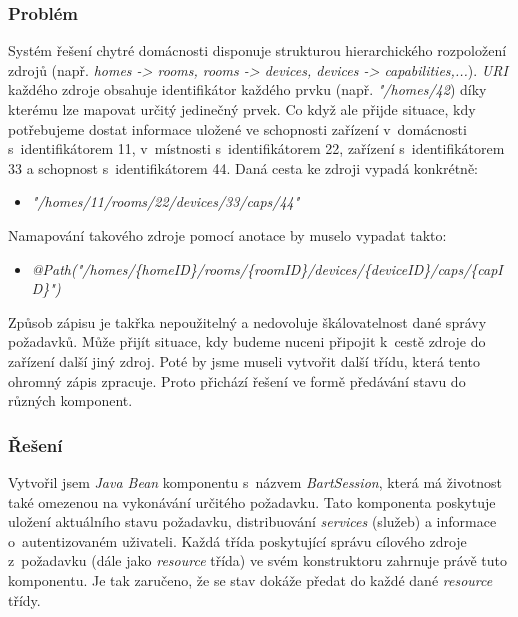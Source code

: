 \subsubsection*{Problém}
Systém řešení chytré domácnosti disponuje strukturou hierarchického rozpoložení zdrojů (např. \emph{homes -> rooms, rooms -> devices, devices -> capabilities,...}).
\emph{URI} každého zdroje obsahuje identifikátor každého prvku (např. \emph{"/homes/42}) díky kterému lze mapovat určitý jedinečný prvek.
Co když ale přijde situace, kdy potřebujeme dostat informace uložené ve schopnosti zařízení v~domácnosti s~identifikátorem 11, v~místnosti s~identifikátorem 22, zařízení s~identifikátorem 33 a schopnost s~identifikátorem 44.
\newline
Daná cesta ke zdroji vypadá konkrétně:
\begin{itemize}
  \item \emph{"/homes/11/rooms/22/devices/33/caps/44"}
\end{itemize}

Namapování takového zdroje pomocí anotace  by muselo vypadat takto:
\begin{itemize}
  \item \emph{@Path("/homes/\{homeID\}/rooms/\{roomID\}/devices/\{deviceID\}/caps/\{capID\}")}
\end{itemize}

Způsob zápisu je takřka nepoužitelný a nedovoluje škálovatelnost dané správy požadavků.
Může přijít situace, kdy budeme nuceni připojit k~cestě zdroje do zařízení další jiný zdroj.
Poté by jsme museli vytvořit další třídu, která tento ohromný zápis zpracuje.
Proto přichází řešení ve formě předávání stavu do různých komponent.

\subsubsection*{Řešení}
Vytvořil jsem \emph{Java Bean} komponentu s~názvem \emph{BartSession}, která má životnost také omezenou na vykonávání určitého požadavku.
Tato komponenta poskytuje uložení aktuálního stavu požadavku, distribuování \emph{services} (služeb) a informace o~autentizovaném uživateli.
Každá třída poskytující správu cílového zdroje z~požadavku (dále jako \emph{resource} třída) ve svém konstruktoru zahrnuje právě tuto komponentu.
Je tak zaručeno, že se stav dokáže předat do každé dané \emph{resource} třídy.

